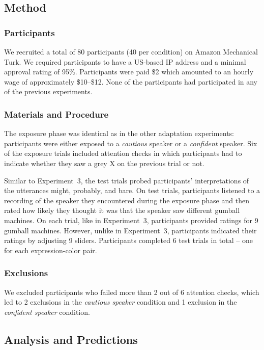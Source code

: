 \subsection{Method}
\subsubsection{Participants}

We recruited a total of 80 participants (40 per condition) on Amazon Mechanical Turk. We required participants to have a US-based IP address and a minimal approval rating of 95\%. Participants were paid \$2 which amounted to an hourly wage of approximately \$10--\$12. None of the participants had participated in any of the previous experiments. 

\subsubsection{Materials and Procedure}

The exposure phase was identical as in the other adaptation experiments: participants were either exposed to a 
\textit{cautious} speaker or a \textit{confident} speaker. Six of the exposure trials included attention checks in which
participants had to indicate whether they saw a grey X on the previous trial or not.

Similar to Experiment~3, the test trials probed participants'
interpretations of the utterances {\sc might}, {\sc probably}, and {\sc bare}. On test trials, participants listened
to a recording of the speaker they encountered during the exposure phase and then rated how likely they
thought it was that the speaker saw different gumball machines. On each trial, like in Experiment~3, participants
provided ratings for 9 gumball machines. However, unlike in Experiment~3, participants indicated their ratings
by adjusting 9 sliders. Participants completed 6 test trials in total -- one for each expression-color pair.

\subsubsection{Exclusions}

We excluded participants who failed more than 2 out of 6 attention checks, which led to 2 exclusions in the \emph{cautious speaker} condition and 1 exclusion in the \emph{confident speaker} condition.


\subsection{Analysis and Predictions}

